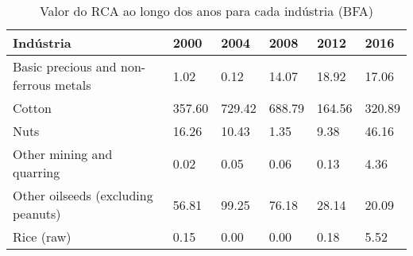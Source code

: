\begin{table}
\centering
\caption{Valor do RCA ao longo dos anos para cada indústria (BFA)}
\label{tab:ex3-tempo-BFA}
\begin{tabular}{p{6cm}p{1.5cm}p{1.5cm}p{1.5cm}p{1.5cm}p{1.5cm}}
\toprule
                            Indústria &   2000 &   2004 &   2008 &   2012 &   2016 \\
\midrule
Basic precious and non-ferrous metals &   1.02 &   0.12 &  14.07 &  18.92 &  17.06 \\
                               Cotton & 357.60 & 729.42 & 688.79 & 164.56 & 320.89 \\
                                 Nuts &  16.26 &  10.43 &   1.35 &   9.38 &  46.16 \\
            Other mining and quarring &   0.02 &   0.05 &   0.06 &   0.13 &   4.36 \\
   Other oilseeds (excluding peanuts) &  56.81 &  99.25 &  76.18 &  28.14 &  20.09 \\
                           Rice (raw) &   0.15 &   0.00 &   0.00 &   0.18 &   5.52 \\
\bottomrule
\end{tabular}
\end{table}
